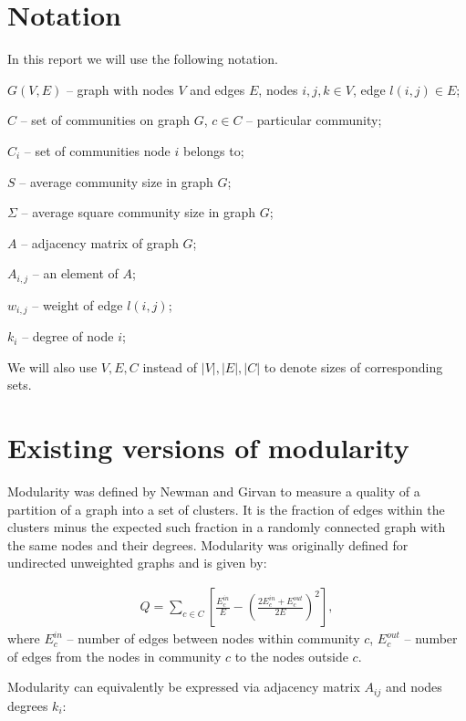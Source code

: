 \documentclass[a4paper,twocolumn]{article}
\begin{document}
\section{Notation}

In this report we will use the following notation.

$G(V,E)$ -- graph with nodes $V$ and edges $E$, nodes $i,j,k \in V$, edge $l(i,j) \in E$;

$C$ -- set of communities on graph $G$, $c \in C$ -- particular community;

$C_i$ -- set of communities node $i$ belongs to;

$S$ -- average community size in graph $G$;

$\Sigma$ -- average square community size in graph $G$;

$A$ -- adjacency matrix of graph $G$;

$A_{i,j}$ -- an element of $A$;

$w_{i,j}$ -- weight of edge $l(i,j)$;

$k_i$ -- degree of node $i$;

We will also use $V, E, C$ instead of $|V|, |E|, |C|$ to denote sizes of corresponding sets.

\section{Existing versions of modularity}

Modularity was defined by Newman and Girvan \cite{Newman2003} to measure a quality of a partition of a graph into a set of clusters. It is the fraction of edges within the clusters minus the expected such fraction in a randomly connected graph with the same nodes and their degrees. Modularity was originally defined for undirected unweighted graphs and is given by:

\begin{equation}
\label{modularity1}
\begin{aligned}
Q =\sum_{c\in C}\left [ \frac{E_c^{in}}{E}-\left ( \frac{2E_c^{in} + E_c^{out}}{2E} \right )^2 \right ],
\end{aligned}
\end{equation}
where $E_c^{in}$ -- number of edges between nodes within community $c$, $E_c^{out}$ -- number of edges from the nodes in community $c$ to the nodes outside $c$.

Modularity can equivalently be expressed via adjacency matrix $A_{ij}$ and nodes degrees $k_i$:
\end{document}
